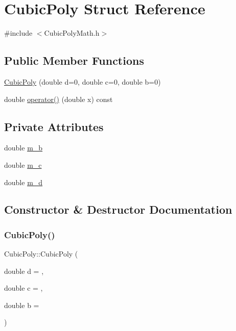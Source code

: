 \hypertarget{structCubicPoly}{}\section{Cubic\+Poly Struct Reference}
\label{structCubicPoly}


{\ttfamily \#include $<$Cubic\+Poly\+Math.\+h$>$}

\subsection*{Public Member Functions}
\begin{DoxyCompactItemize}
\item 
\hyperlink{structCubicPoly_a660757a2c3fee37a0d209941a913aba1}{Cubic\+Poly} (double d=0, double c=0, double b=0)
\item 
double \hyperlink{structCubicPoly_a3f4d98099aaf276976a1774ac423710c}{operator()} (double x) const
\end{DoxyCompactItemize}
\subsection*{Private Attributes}
\begin{DoxyCompactItemize}
\item 
double \hyperlink{structCubicPoly_a6520ee317b424560304e29651aaa20f1}{m\+\_\+b}
\item 
double \hyperlink{structCubicPoly_ae3b58654c585f20595ade22b6d7647df}{m\+\_\+c}
\item 
double \hyperlink{structCubicPoly_a3fad81958f1c21947a61b7253b16394e}{m\+\_\+d}
\end{DoxyCompactItemize}


\subsection{Constructor \& Destructor Documentation}
\mbox{\label{structCubicPoly_a660757a2c3fee37a0d209941a913aba1}} 
\subsubsection{\texorpdfstring{Cubic\+Poly()}{CubicPoly()}}
{\footnotesize\ttfamily Cubic\+Poly\+::\+Cubic\+Poly (\begin{DoxyParamCaption}\item[{double}]{d = {},  }\item[{double}]{c = {},  }\item[{double}]{b = {} }\end{DoxyParamCaption})\hspace{0.3cm}{\ttfamily [inline]}}



